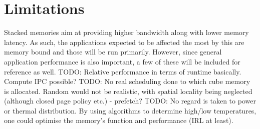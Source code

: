 \section{Limitations}
Stacked memories aim at providing higher bandwidth along with lower memory latency. As such, the applications expected to be affected the most by this are memory bound and those will be run primarily. However, since general application performance is also important, a few of these will be included for reference as well. TODO: Relative performance in terms of runtime basically. Compute IPC possible? 
TODO: No real scheduling done to which cube memory is allocated. Random would not be realistic, with spatial locality being neglected (although closed page policy etc.) - prefetch?
TODO: No regard is taken to power or thermal distribution. By using algorithms to determine high/low temperatures, one could optimise the memory's function and performance (IRL at least).

